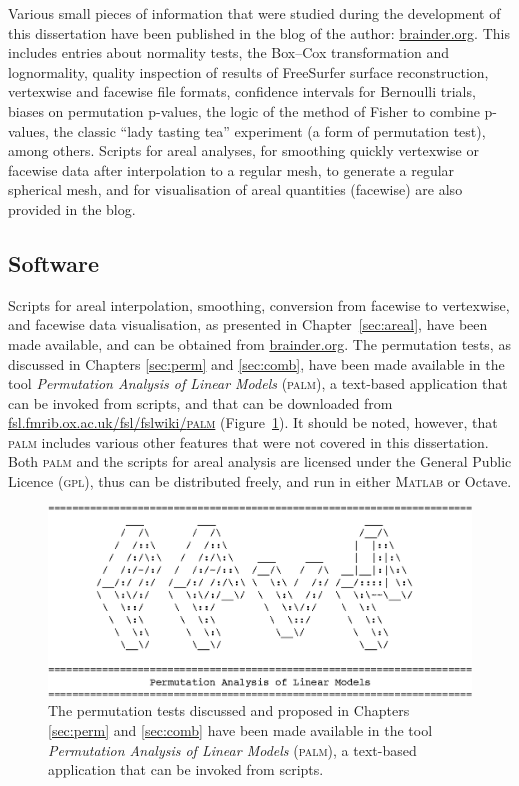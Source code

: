 Various small pieces of information that were studied during the development of this dissertation have been published in the blog of the author: \href{http://brainder.org}{brainder.org}. This includes entries about normality tests, the Box--Cox transformation and log\-normality, quality inspection of results of FreeSurfer surface reconstruction, vertexwise and facewise file formats, confidence intervals for Bernoulli trials, biases on permutation p-values, the logic of the method of Fisher to combine p-values, the classic ``lady tasting tea'' experiment (a form of permutation test), among others. Scripts for areal analyses, for smoothing quickly vertexwise or facewise data after interpolation to a regular mesh, to generate a regular spherical mesh, and for visualisation of areal quantities (facewise) are also provided in the blog.

\subsection{Software}

Scripts for areal interpolation, smoothing, conversion from facewise to vertexwise, and facewise data visualisation, as presented in Chapter~\ref{sec:areal}, have been made available, and can be obtained from \href{http://brainder.org}{brainder.org}. The permutation tests, as discussed in Chapters \ref{sec:perm} and \ref{sec:comb}, have been made available in the tool \emph{Permutation Analysis of Linear Models} (\textsc{palm}), a text-based application that can be invoked from scripts, and that can be downloaded from \href{http://fsl.fmrib.ox.ac.uk/fsl/fslwiki/PALM}{fsl.fmrib.ox.ac.uk/fsl/fslwiki/\textsc{palm}} (Figure~\ref{fig:valor:palm}). It should be noted, however, that \textsc{palm} includes various other features that were not covered in this dissertation. Both \textsc{palm} and the scripts for areal analysis are licensed under the General Public Licence (\textsc{gpl}), thus can be distributed freely, and run in either \textsc{Matlab} or Octave.

\begin{figure}[tbp]
\begin{center}
\centerline{\includegraphics[width=14cm]{images/palm.eps}}
\end{center}
\caption[The proposed tests are available in \textsc{palm}.]{The permutation tests discussed and proposed in Chapters \ref{sec:perm} and \ref{sec:comb} have been made available in the tool \emph{Permutation Analysis of Linear Models} (\textsc{palm}), a text-based application that can be invoked from scripts.}
\label{fig:valor:palm}
\end{figure}

